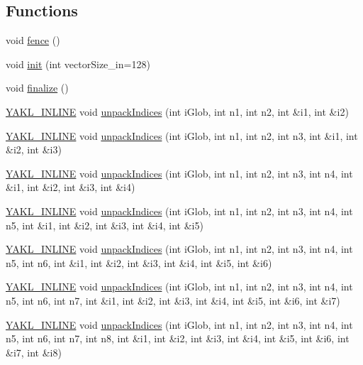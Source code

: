\subsection*{Functions}
\begin{DoxyCompactItemize}
\item 
void \hyperlink{namespaceyakl_a5debd8fe5fff4f37c06e55648d138e0c}{fence} ()
\item 
void \hyperlink{namespaceyakl_afac5fb2f9440a6d7ee378941d8d58daa}{init} (int vector\+Size\+\_\+in=128)
\item 
void \hyperlink{namespaceyakl_ab42370df4914644cfd129ff6037c5c9f}{finalize} ()
\item 
\hyperlink{YAKL_8h_aa0dd629ffce6d564b19e9313fb91a5ad}{Y\+A\+K\+L\+\_\+\+I\+N\+L\+I\+NE} void \hyperlink{namespaceyakl_ae5d52efb6b604b973e2459a72db868e7}{unpack\+Indices} (int i\+Glob, int n1, int n2, int \&i1, int \&i2)
\item 
\hyperlink{YAKL_8h_aa0dd629ffce6d564b19e9313fb91a5ad}{Y\+A\+K\+L\+\_\+\+I\+N\+L\+I\+NE} void \hyperlink{namespaceyakl_a3c5dabe0c0c280c2944067d241196bcc}{unpack\+Indices} (int i\+Glob, int n1, int n2, int n3, int \&i1, int \&i2, int \&i3)
\item 
\hyperlink{YAKL_8h_aa0dd629ffce6d564b19e9313fb91a5ad}{Y\+A\+K\+L\+\_\+\+I\+N\+L\+I\+NE} void \hyperlink{namespaceyakl_ab40f47e063e6955cb494c8da1a7beb6e}{unpack\+Indices} (int i\+Glob, int n1, int n2, int n3, int n4, int \&i1, int \&i2, int \&i3, int \&i4)
\item 
\hyperlink{YAKL_8h_aa0dd629ffce6d564b19e9313fb91a5ad}{Y\+A\+K\+L\+\_\+\+I\+N\+L\+I\+NE} void \hyperlink{namespaceyakl_a030f82c405c0c5cc61833a5839a2398d}{unpack\+Indices} (int i\+Glob, int n1, int n2, int n3, int n4, int n5, int \&i1, int \&i2, int \&i3, int \&i4, int \&i5)
\item 
\hyperlink{YAKL_8h_aa0dd629ffce6d564b19e9313fb91a5ad}{Y\+A\+K\+L\+\_\+\+I\+N\+L\+I\+NE} void \hyperlink{namespaceyakl_ad0b25c0576e27b7e385b4bc404cdff49}{unpack\+Indices} (int i\+Glob, int n1, int n2, int n3, int n4, int n5, int n6, int \&i1, int \&i2, int \&i3, int \&i4, int \&i5, int \&i6)
\item 
\hyperlink{YAKL_8h_aa0dd629ffce6d564b19e9313fb91a5ad}{Y\+A\+K\+L\+\_\+\+I\+N\+L\+I\+NE} void \hyperlink{namespaceyakl_a78dd2733fbd48eea6665c74f133efd15}{unpack\+Indices} (int i\+Glob, int n1, int n2, int n3, int n4, int n5, int n6, int n7, int \&i1, int \&i2, int \&i3, int \&i4, int \&i5, int \&i6, int \&i7)
\item 
\hyperlink{YAKL_8h_aa0dd629ffce6d564b19e9313fb91a5ad}{Y\+A\+K\+L\+\_\+\+I\+N\+L\+I\+NE} void \hyperlink{namespaceyakl_a9ce8fa30c4c61c1789dbda70c72f22e9}{unpack\+Indices} (int i\+Glob, int n1, int n2, int n3, int n4, int n5, int n6, int n7, int n8, int \&i1, int \&i2, int \&i3, int \&i4, int \&i5, int \&i6, int \&i7, int \&i8)

\end{DoxyCompactItemize}
